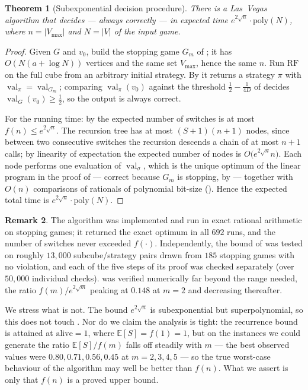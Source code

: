 \documentclass[11pt]{article}
\theoremstyle{plain}
\newtheorem{theorem}{Theorem}[section]
\theoremstyle{definition}
\newtheorem{remark}[theorem]{Remark}
\DeclareMathOperator{\val}{val}
\newcommand{\Vmax}{V_{\max}}
\begin{document}
\begin{theorem}[Subexponential decision procedure]\label{thm:subexp}
There is a Las~Vegas algorithm that decides  --- always
correctly --- in expected time $e^{2\sqrt n}\cdot\mathrm{poly}(N)$, where
$n=|\Vmax|$ and $N=|V|$ of the input game.
\end{theorem}

\begin{proof}
Given $G$ and $v_0$, build the stopping game $G_m$ of
; it has $O(N(a+\log N))$ vertices and the
same set $\Vmax$, hence the same $n$. Run $\mathrm{RF}$ on the full cube
from an arbitrary initial strategy. By  it returns a
strategy $\pi$ with $\val_\pi=\val_{G_m}$; comparing $\val_\pi(v_0)$
against the threshold $\tfrac12-\tfrac1{4D}$ of
 decides $\val_G(v_0)\ge\tfrac12$, so the
output is always correct.

For the running time: by  the expected
number of switches is at most $f(n)\le e^{2\sqrt n}$. The recursion tree
has at most $(S+1)(n+1)$ nodes, since between two consecutive switches
the recursion descends a chain of at most $n+1$ calls; by linearity of
expectation the expected number of nodes is $O\bigl(e^{2\sqrt n}n\bigr)$.
Each node performs one evaluation of $\val_\sigma$, which is the unique
optimum of the linear program in the proof of
 --- correct because $G_m$ is stopping, by
 --- together with $O(n)$ comparisons of rationals
of polynomial bit-size (). Hence the expected total
time is $e^{2\sqrt n}\cdot\mathrm{poly}(N)$.
\end{proof}

\begin{remark}
The algorithm was implemented and run in exact rational arithmetic on
stopping games; it returned the exact optimum in all $692$ runs, and the
number of switches never exceeded $f(\cdot)$. Independently, the bound of
 was tested on roughly $13{,}000$ subcube/strategy
pairs drawn from $185$ stopping games with no violation, and each of the
five steps of its proof was checked separately (over $50{,}000$
individual checks).  was verified numerically far beyond
the range needed, the ratio $f(m)/e^{2\sqrt m}$ peaking at $0.148$ at
$m=2$ and decreasing thereafter.

We stress what  is not. The bound $e^{2\sqrt n}$ is
subexponential but superpolynomial, so this does not touch
. Nor do we claim the analysis is tight: the recurrence
bound is attained at $\mathrm{alive}=1$, where $\mathbb{E}[S]=f(1)=1$, but
on the instances we could generate the ratio $\mathbb{E}[S]/f(m)$ falls
off steadily with $m$ --- the best observed values were
$0.80,0.71,0.56,0.45$ at $m=2,3,4,5$ --- so the true worst-case behaviour
of the algorithm may well be better than $f(n)$. What we assert is only
that $f(n)$ is a proved upper bound.
\end{remark}
\end{document}
